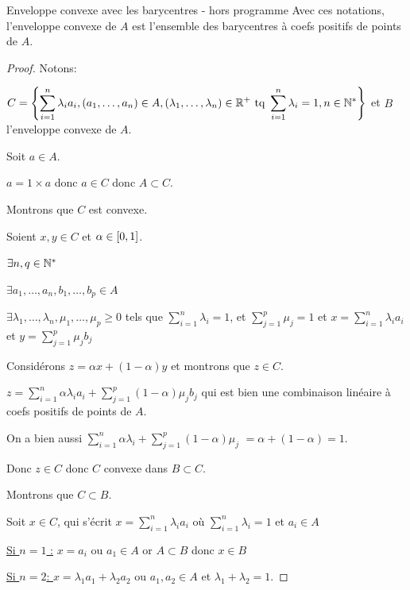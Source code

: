 \begin{theoreme}{Enveloppe convexe avec les barycentres - hors programme}{}
    Avec ces notations, l'enveloppe convexe de $A$ est l'ensemble des barycentres à
    coefs positifs de points de $A$. 
\end{theoreme}

\begin{proof}
    Notons:
    
    $\displaystyle C = \left\{\sum_{i = 1}^n \lambda_i a_i, (a_1, \dots, a_n) \in A, (\lambda_1, \dots, \lambda_n) \in \mathbb{R}^+ \text{ tq } \sum_{i = 1}^n \lambda_i = 1, n \in \mathbb{N}^*\right\}$
    et $B$ l'enveloppe convexe de $A$. 

    Soit $a \in A$. 

    $a = 1 \times a$ donc $a \in C$ donc $A \subset C$. 

    Montrons que $C$ est convexe. 

    Soient $x, y \in C$ et $\alpha \in \left[0, 1\right]$. 

    $\exists n, q \in \mathbb{N}^*$

    $\exists a_1, \dots, a_n, b_1, \dots, b_p \in A$

    $\exists \lambda_1, \dots, \lambda_n, \mu_1, \dots, \mu_p \geqslant 0$ tels que 
    $\displaystyle \sum_{i = 1}^{n} \lambda_i = 1$, et $\displaystyle \sum_{j = 1}^{p} \mu_j = 1$ et 
    $\displaystyle x = \sum_{i = 1}^{n }\lambda_i a_i$ et $\displaystyle y = \sum_{j = 1}^{p } \mu_j b_j$

    Considérons $z = \alpha x + (1 - \alpha)y$ et montrons que $z \in C$. 

    $\displaystyle z = \sum_{i = 1}^{n} \alpha \lambda_i a_i + \sum_{j = 1}^{p } (1 - \alpha) \mu_j b_j$
    qui est bien une combinaison linéaire à coefs positifs de points de $A$. 

    On a bien aussi $\displaystyle \sum_{i = 1}^{n } \alpha \lambda_i + \sum_{j = 1}^{p } (1 - \alpha) \mu_j$
    $ = \alpha + (1 - \alpha) = 1$. 

    Donc $z \in C$ donc $C$ convexe dans $B \subset C$. 

    Montrons que $C \subset B$. 

    Soit $x \in C$, qui s'écrit $\displaystyle x = \sum_{ i = 1}^{n }\lambda_i a_i$ où 
    $\displaystyle \sum_{i = 1}^{n } \lambda_i = 1$ et $a_i \in A$

    \quad \underline{Si $n = 1$ :} $x = a_i$ ou $a_1 \in A$
    or $A \subset B$ donc $x \in B$

    \quad \underline{Si $n = 2$: } $x = \lambda_1 a_1 + \lambda_2 a_2$ ou $a_1, a_2 \in A$ et 
    $\lambda_1 + \lambda_2 = 1$. 


\end{proof}
